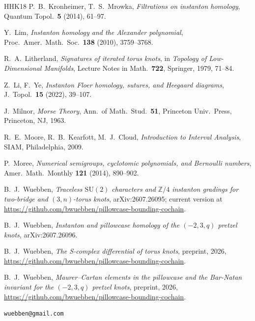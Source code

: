 \documentclass[11pt,reqno]{amsart}
\theoremstyle{plain}
\theoremstyle{definition}
\numberwithin{equation}{section}
\begin{document}
\begin{thebibliography}{HHK18}
 P.~B.~Kronheimer, T.~S.~Mrowka, \emph{Filtrations on instanton homology}, Quantum
Topol.\ \textbf{5} (2014), 61--97.

 Y.~Lim, \emph{Instanton homology and the Alexander polynomial}, Proc.\ Amer.\
Math.\ Soc.\ \textbf{138} (2010), 3759--3768.

 R.~A.~Litherland, \emph{Signatures of iterated torus knots}, in
\emph{Topology of Low-Dimensional Manifolds}, Lecture Notes in Math.\ \textbf{722}, Springer, 1979,
71--84.

 Z.~Li, F.~Ye, \emph{Instanton Floer homology, sutures, and Heegaard diagrams}, J.\
Topol.\ \textbf{15} (2022), 39--107.

 J.~Milnor, \emph{Morse Theory}, Ann.\ of Math.\ Stud.\ \textbf{51}, Princeton Univ.\ Press,
Princeton, NJ, 1963.

 R.~E.~Moore, R.~B.~Kearfott, M.~J.~Cloud, \emph{Introduction to Interval
Analysis}, SIAM, Philadelphia, 2009.

 P.~Moree, \emph{Numerical semigroups, cyclotomic polynomials, and Bernoulli numbers},
Amer.\ Math.\ Monthly \textbf{121} (2014), 890--902.

 B.~J.~Wuebben, \emph{Traceless $\mathrm{SU}(2)$ characters and $\mathbb{Z}/4$ instanton
gradings for two-bridge and $(3,n)$-torus knots}, arXiv:2607.26095; current version at \url{https://github.com/bwuebben/pillowcase-bounding-cochain}.

\bibitem[Wue26b]{WuebbenII} B.~J.~Wuebben, \emph{Instanton and pillowcase homology of the $(-2,3,q)$ pretzel
knots}, arXiv:2607.26096.

 B.~J.~Wuebben, \emph{The S-complex differential of torus knots}, preprint, 2026,
\url{https://github.com/bwuebben/pillowcase-bounding-cochain}.

 B.~J.~Wuebben, \emph{Maurer--Cartan elements in the pillowcase and the Bar-Natan invariant for the $(-2,3,q)$ pretzel knots}, preprint, 2026, \url{https://github.com/bwuebben/pillowcase-bounding-cochain}.

\end{thebibliography}

\bigskip
{} \texttt{wuebben@gmail.com}
\end{document}

